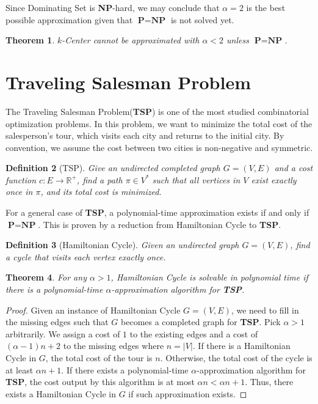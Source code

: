 \documentclass[11pt,psfig,times]{article}
\newcommand*{\PTIME}{\textbf{P}}
\newcommand*{\NP}{\textbf{NP}}
\newtheorem{theorem}{Theorem}
\newtheorem{definition}[theorem]{Definition}
\begin{document}
Since Dominating Set is \NP-hard, we may conclude that $\alpha = 2$ is the best possible approximation given that $\PTIME = \NP$ is not solved yet. 
\begin{theorem}
    $k$-Center cannot be approximated with $\alpha < 2$ unless $\PTIME = \NP$.
\end{theorem}

\section{Traveling Salesman Problem}
The Traveling Salesman Problem(\textbf{TSP}) is one of the most studied combinatorial optimization problems.
In this problem, we want to minimize the total cost of the salesperson's tour, which visits each city and returns to 
the initial city. By convention, we assume the cost between two cities is non-negative and symmetric.  
\begin{definition}[TSP]
    Give an undirected completed graph $G = (V, E)$ and a cost function $c: E \rightarrow \mathbb{R}^+$, find a path $\pi \in V^*$
    such that all vertices in $V$ exist exactly once in $\pi$, and its total cost is minimized.
\end{definition}
For a general case of \textbf{TSP}, a polynomial-time approximation exists if and only if $\PTIME = \NP$. This is proven 
by a reduction from Hamiltonian Cycle to \textbf{TSP}.
\begin{definition}[Hamiltonian Cycle]
    Given an undirected graph $G = (V, E)$, find a cycle that visits each vertex exactly once.
\end{definition}
\begin{theorem}
    For any $\alpha > 1$, Hamiltonian Cycle is solvable in polynomial time if there is a polynomial-time $\alpha$-approximation algorithm 
    for \textbf{TSP}.
\end{theorem}
\begin{proof}
    Given an instance of Hamiltonian Cycle $G = (V, E)$, we need to fill in the missing edges such that $G$ becomes 
    a completed graph for \textbf{TSP}. Pick $\alpha > 1$ arbitrarily. 
    We assign a cost of $1$ to the existing edges and a cost of $(\alpha - 1) n + 2$ to the missing 
    edges where $n = |V|$. If there is a Hamiltonian Cycle in $G$, the total cost of the tour is $n$. 
    Otherwise, the total cost of the cycle is at least $\alpha n + 1$. If there exists a polynomial-time $\alpha$-approximation algorithm 
    for \textbf{TSP}, the cost output by this algorithm is at most $\alpha n < \alpha n + 1$. Thus, there exists a 
    Hamiltonian Cycle in $G$ if such approximation exists.  
\end{proof}
\end{document}
